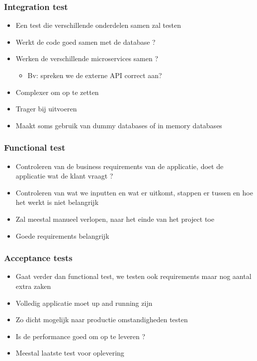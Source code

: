 \documentclass{article}
\begin{document}
\subsubsection{Integration test}

\begin{itemize}
    \item Een test die verschillende onderdelen samen zal testen
    \item Werkt de code goed samen met de database ?
    \item Werken de verschillende microservices samen ?
    \begin{itemize}
        \item Bv: spreken we de externe API correct aan?
    \end{itemize}
    \item Complexer om op te zetten
    \item Trager bij uitvoeren
    \item Maakt soms gebruik van dummy databases of in memory databases
\end{itemize}

\subsubsection{Functional test}

\begin{itemize}
    \item Controleren van de business requirements van de applicatie, doet de applicatie wat de klant vraagt ?
    \item Controleren van wat we inputten en wat er uitkomt, stappen er tussen en hoe het werkt is niet belangrijk
    \item Zal meestal manueel verlopen, naar het einde van het project toe
    \item Goede requirements belangrijk
\end{itemize}

\subsubsection{Acceptance tests}

\begin{itemize}
    \item Gaat verder dan functional test, we testen ook requirements maar nog aantal extra zaken
    \item Volledig applicatie moet up and running zijn
    \item Zo dicht mogelijk naar productie omstandigheden testen
    \item Is de performance goed om op te leveren ?
    \item Meestal laatste test voor oplevering
\end{itemize}
\end{document}
